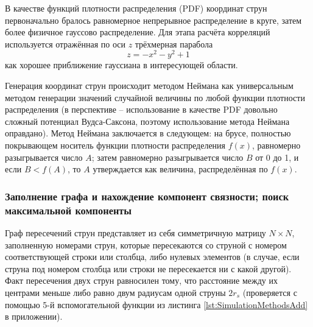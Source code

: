 В качестве функций плотности распределения (PDF) координат струн первоначально бралось равномерное непрерывное распределение в круге, затем более физичное гауссово распределение. Для этапа расчёта корреляций используется отражённая по оси $z$ трёхмерная парабола
\begin{equation} \label{eq:parabolaPDF}
	z = -x^2 - y^2 + 1
\end{equation}
как хорошее приближение гауссиана в интересующей области. 

Генерация координат струн происходит методом Неймана как универсальным методом генерации значений случайной величины по любой функции плотности распределения (в перспективе -- использование в качестве PDF довольно сложный потенциал Вудса-Саксона, поэтому использование метода Неймана оправдано). Метод Неймана заключается в следующем: на брусе, полностью покрывающем носитель функции плотности распределения $f(x)$, равномерно разыгрывается число $A$; затем равномерно разыгрывается число $B$ от 0 до 1, и если $B < f(A)$, то $A$ утверждается как величина, распределённая по $f(x)$.
\subsubsection{Заполнение графа и нахождение компонент связности; поиск максимальной компоненты}
Граф пересечений струн представляет из себя симметричную матрицу $N \times N$, заполненную номерами струн, которые пересекаются со струной с номером соответствующей строки или столбца, либо нулевых элементов (в случае, если струна под номером столбца или строки не пересекается ни с какой другой). Факт пересечения двух струн равносилен тому, что расстояние между их центрами меньше либо равно двум радиусам одной струны $2r_s$ (проверяется с помощью 5-й вспомогательной функции из листинга \ref{lst:SimulationMethodsAdd} в приложении). 

